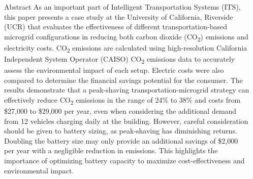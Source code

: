 \documentclass[final, 36 pt]{beamer}
\newlength{\sepwid}
\newlength{\onecolwid}
\begin{document}
\begin{frame}[t] %

\begin{columns}[t] %

\begin{column}{\sepwid}\end{column} %

\begin{column}{\onecolwid} %

\begin{alertblock}{Abstract}
	As an important part of Intelligent Transportation Systems (ITS), this paper presents a case study at the University of California, Riverside (UCR) that evaluates the effectiveness of different transportation-based microgrid configurations in reducing both carbon dioxide (CO\textsubscript{2}) emissions and electricity costs. CO\textsubscript{2} emissions are calculated using high-resolution California Independent System Operator (CAISO) CO\textsubscript{2} emissions data to accurately assess the environmental impact of each setup. Electric costs were also compared to determine the financial savings potential for the consumer. The results demonstrate that a peak-shaving transportation-microgrid strategy can effectively reduce CO\textsubscript{2} emissions in the range of 24\% to 38\% and costs from \$27,000 to \$29,000 per year, even when considering the additional demand from 12 vehicles charging daily at the building. However, careful consideration should be given to battery sizing, as peak-shaving has diminishing returns. Doubling the battery size may only provide an additional savings of \$2,000 per year with a negligible reduction in emissions. This highlights the importance of optimizing battery capacity to maximize cost-effectiveness and environmental impact.
\end{alertblock}

\end{column}
\end{columns}
\end{frame}
\end{document}

